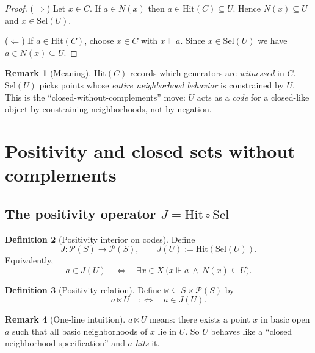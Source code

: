 \documentclass[11pt]{article}
\theoremstyle{definition}
\newtheorem{definition}{Definition}[section]
\newtheorem{remark}[definition]{Remark}
\theoremstyle{plain}
\newcommand{\Pow}{\mathcal P}
\newcommand{\Hit}{\mathrm{Hit}}
\newcommand{\Sel}{\mathrm{Sel}}
\newcommand{\forces}{\Vdash}
\newcommand{\ltimesrel}{\ltimes}
\begin{document}
\begin{proof}
($\Rightarrow$) Let $x\in C$. If $a\in N(x)$ then $a\in\Hit(C)\subseteq U$. Hence $N(x)\subseteq U$ and $x\in\Sel(U)$.

($\Leftarrow$) If $a\in\Hit(C)$, choose $x\in C$ with $x\forces a$. Since $x\in\Sel(U)$ we have $a\in N(x)\subseteq U$.
\end{proof}

\begin{remark}[Meaning]
$\Hit(C)$ records which generators are \emph{witnessed} in $C$.
$\Sel(U)$ picks points whose \emph{entire neighborhood behavior} is constrained by $U$.
This is the ``closed-without-complements'' move: $U$ acts as a \emph{code} for a closed-like object by constraining neighborhoods, not by negation.
\end{remark}

\section{Positivity and closed sets without complements}

\subsection{The positivity operator $J=\Hit\circ\Sel$}

\begin{definition}[Positivity interior on codes]
Define
\[
J:\Pow(S)\to\Pow(S),\qquad J(U):=\Hit(\Sel(U)).
\]
Equivalently,
\[
a\in J(U)\quad\Longleftrightarrow\quad \exists x\in X\ \bigl(x\forces a\ \wedge\ N(x)\subseteq U\bigr).
\]
\end{definition}

\begin{definition}[Positivity relation]
Define $\ltimesrel\subseteq S\times \Pow(S)$ by
\[
a\ltimesrel U \quad:\Longleftrightarrow\quad a\in J(U).
\]
\end{definition}

\begin{remark}[One-line intuition]
$a\ltimesrel U$ means: there exists a point $x$ in basic open $a$ such that all basic neighborhoods of $x$ lie in $U$.
So $U$ behaves like a ``closed neighborhood specification'' and $a$ \emph{hits} it.
\end{remark}
\end{document}
